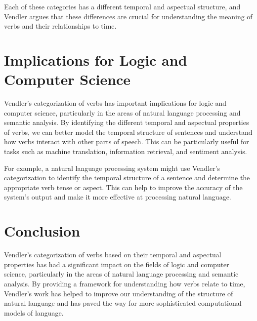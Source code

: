 Each of these categories has a different temporal and aspectual structure, and Vendler argues that these differences are crucial for understanding the meaning of verbs and their relationships to time.

\section{Implications for Logic and Computer Science}

Vendler's categorization of verbs has important implications for logic and computer science, particularly in the areas of natural language processing and semantic analysis. By identifying the different temporal and aspectual properties of verbs, we can better model the temporal structure of sentences and understand how verbs interact with other parts of speech. This can be particularly useful for tasks such as machine translation, information retrieval, and sentiment analysis.

For example, a natural language processing system might use Vendler's categorization to identify the temporal structure of a sentence and determine the appropriate verb tense or aspect. This can help to improve the accuracy of the system's output and make it more effective at processing natural language.

\section{Conclusion}

Vendler's categorization of verbs based on their temporal and aspectual properties has had a significant impact on the fields of logic and computer science, particularly in the areas of natural language processing and semantic analysis. By providing a framework for understanding how verbs relate to time, Vendler's work has helped to improve our understanding of the structure of natural language and has paved the way for more sophisticated computational models of language.



